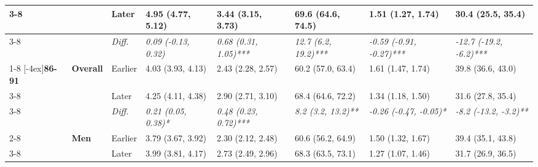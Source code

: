 \documentclass[12pt, a4paper]{article}
\begin{document}
\begin{appendices}
\begin{table}[!p]
{\begin{tabular}[t]{>{}l>{}lllllll}
        \cmidrule{3-8}
                                              &                                   & Later                         & 4.95 (4.77, 5.12)                           & 3.44 (3.15, 3.73)                            & 69.6 (64.6, 74.5)                           & 1.51 (1.27, 1.74)                               & 30.4 (25.5, 35.4)                              \\
        \cmidrule{3-8}
                                              &                                   & \cellcolor{gray!10}\em{Diff.} & \cellcolor{gray!10}\em{0.09 (-0.13, 0.32)}  & \cellcolor{gray!10}\em{0.68 (0.31, 1.05)***} & \cellcolor{gray!10}\em{12.7 (6.2, 19.2)***} & \cellcolor{gray!10}\em{-0.59 (-0.91, -0.27)***} & \cellcolor{gray!10}\em{-12.7 (-19.2, -6.2)***} \\
        \cmidrule{1-8}
        \multirow{9}{*}[-4ex]{\textbf{86-91}} & \multirow{3}{*}{\textbf{Overall}} & Earlier                       & 4.03 (3.93, 4.13)                           & 2.43 (2.28, 2.57)                            & 60.2 (57.0, 63.4)                           & 1.61 (1.47, 1.74)                               & 39.8 (36.6, 43.0)                              \\
        \cmidrule{3-8}
                                              &                                   & Later                         & 4.25 (4.11, 4.38)                           & 2.90 (2.71, 3.10)                            & 68.4 (64.6, 72.2)                           & 1.34 (1.18, 1.50)                               & 31.6 (27.8, 35.4)                              \\
        \cmidrule{3-8}
                                              &                                   & \cellcolor{gray!10}\em{Diff.} & \cellcolor{gray!10}\em{0.21 (0.05, 0.38)*}  & \cellcolor{gray!10}\em{0.48 (0.23, 0.72)***} & \cellcolor{gray!10}\em{8.2 (3.2, 13.2)**}   & \cellcolor{gray!10}\em{-0.26 (-0.47, -0.05)*}   & \cellcolor{gray!10}\em{-8.2 (-13.2, -3.2)**}   \\
        \cmidrule{2-8}
                                              & \multirow{3}{*}{\textbf{Men}}     & Earlier                       & 3.79 (3.67, 3.92)                           & 2.30 (2.12, 2.48)                            & 60.6 (56.2, 64.9)                           & 1.50 (1.32, 1.67)                               & 39.4 (35.1, 43.8)                              \\
        \cmidrule{3-8}
                                              &                                   & Later                         & 3.99 (3.81, 4.17)                           & 2.73 (2.49, 2.96)                            & 68.3 (63.5, 73.1)                           & 1.27 (1.07, 1.46)                               & 31.7 (26.9, 36.5)                              \\

\end{tabular}}
\end{table}
\end{appendices}
\end{document}
